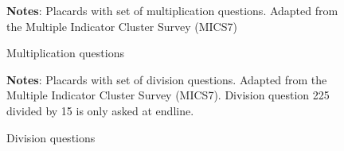\documentclass[hidelinks,12pt]{article}
\begin{document}
\begin{figure}[H]
\centering
\caption{Multiplication questions}\label{fig:num_multiplication}
\footnotesize{\justify\textbf{Notes}: Placards with set of multiplication questions. Adapted from the Multiple Indicator Cluster Survey (MICS7)}
\end{figure}

\begin{figure}[H]
\centering
\caption{Division questions}\label{fig:num_division}
\footnotesize{\justify\textbf{Notes}: Placards with set of division questions. Adapted from the Multiple Indicator Cluster Survey (MICS7). Division question 225 divided by 15 is only asked at endline.}
\end{figure}
\end{document}
